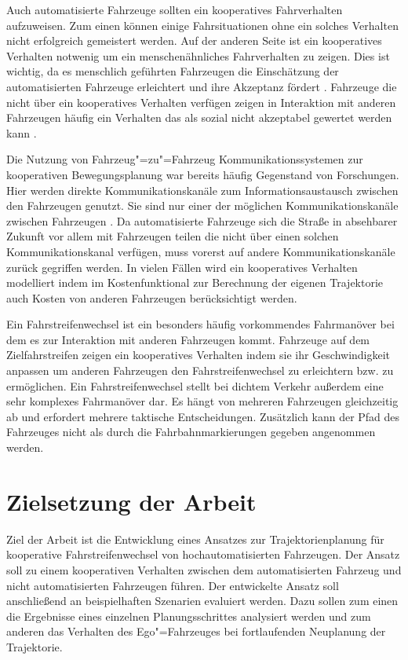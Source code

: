 Auch automatisierte Fahrzeuge sollten ein kooperatives Fahrverhalten aufzuweisen.
Zum einen k\"onnen einige Fahrsituationen ohne ein solches Verhalten nicht erfolgreich gemeistert werden.
Auf der anderen Seite ist ein kooperatives Verhalten notwenig um ein menschen\"ahnliches Fahrverhalten zu zeigen.
Dies ist wichtig, da es menschlich gef\"uhrten Fahrzeugen die Einsch\"atzung der automatisierten Fahrzeuge erleichtert und ihre Akzeptanz f\"ordert \cite{Naumann2017}.
Fahrzeuge die nicht \"uber ein kooperatives Verhalten verf\"ugen zeigen in Interaktion mit anderen Fahrzeugen h\"aufig ein Verhalten das als sozial nicht akzeptabel gewertet werden kann \cite{Wei2013}.

Die Nutzung von Fahrzeug"=zu"=Fahrzeug Kommunikationssystemen zur kooperativen Bewegungsplanung war bereits h\"aufig Gegenstand von Forschungen.
Hier werden direkte Kommunikationskan\"ale zum Informationsaustausch zwischen den Fahrzeugen genutzt.
Sie sind nur einer der m\"oglichen Kommunikationskan\"ale zwischen Fahrzeugen \cite{Ulbrich2015}.
Da automatisierte Fahrzeuge sich die Stra{\ss}e in absehbarer Zukunft vor allem mit Fahrzeugen teilen die nicht \"uber einen solchen Kommunikationskanal verf\"ugen, muss vorerst auf andere Kommunikationskan\"ale zur\"uck gegriffen werden.
In vielen F\"allen wird ein kooperatives Verhalten modelliert indem im Kostenfunktional zur Berechnung der eigenen Trajektorie auch Kosten von anderen Fahrzeugen ber\"ucksichtigt werden.

Ein Fahrstreifenwechsel ist ein besonders h\"aufig vorkommendes Fahrman\"over bei dem es zur Interaktion mit anderen Fahrzeugen kommt.
Fahrzeuge auf dem Zielfahrstreifen zeigen ein kooperatives Verhalten indem sie ihr Geschwindigkeit anpassen um anderen Fahrzeugen den Fahrstreifenwechsel zu erleichtern bzw. zu erm\"oglichen.
Ein Fahrstreifenwechsel stellt bei dichtem Verkehr au{\ss}erdem eine sehr komplexes Fahrman\"over dar.
Es h\"angt von mehreren Fahrzeugen gleichzeitig ab und erfordert mehrere taktische Entscheidungen.
Zus\"atzlich kann der Pfad des Fahrzeuges nicht als durch die Fahrbahnmarkierungen gegeben angenommen werden.


\section{Zielsetzung der Arbeit}
Ziel der Arbeit ist die Entwicklung eines Ansatzes zur Trajektorienplanung f\"ur kooperative Fahrstreifenwechsel von hochautomatisierten Fahrzeugen.
Der Ansatz soll zu einem kooperativen Verhalten zwischen dem automatisierten Fahrzeug und nicht automatisierten Fahrzeugen f\"uhren.
Der entwickelte Ansatz soll anschlie{\ss}end an beispielhaften Szenarien evaluiert werden.
Dazu sollen zum einen die Ergebnisse eines einzelnen Planungsschrittes analysiert werden und zum anderen das Verhalten des Ego"=Fahrzeuges bei fortlaufenden Neuplanung der Trajektorie.

